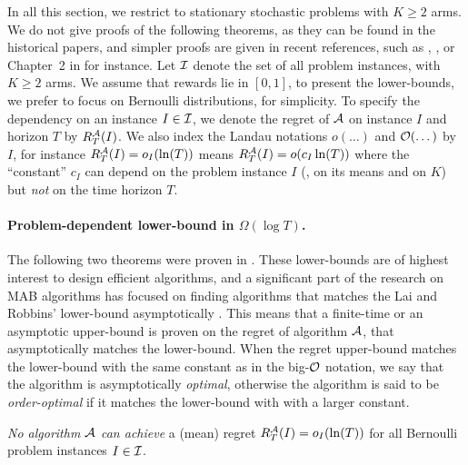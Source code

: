 In all this section, we restrict to stationary stochastic problems with $K\geq2$ arms.
We do not give proofs of the following theorems, as they can be found in the historical papers, and simpler proofs are given in recent references, such as \cite{Bubeck12}, \cite{LattimoreBanditAlgorithmsBook}, or Chapter~2 in \cite{Slivkins2019} for instance.
%
Let $\mathcal{I}$ denote the set of all problem instances, with $K \geq 2$ arms.
We assume that rewards lie in $[0,1]$,
to present the lower-bounds, we prefer to focus on Bernoulli distributions, for simplicity.
%
To specify the dependency on an instance $I\in\mathcal{I}$, we denote the regret of $\mathcal{A}$ on instance $I$ and horizon $T$ by $R_T^{\mathcal{A}}(I)$.
We also index the Landau notations $o(\dots)$ and $\mathop{}\mathopen{}\mathcal{O}\mathopen{}\left(\dots\right)$ by $I$,
for instance $R_T^{\mathcal{A}}(I) = o_I(\ln(T))$ means $R_T^{\mathcal{A}}(I) = \mathop{}\mathopen{}o\mathopen{}\left(c_I \ln(T)\right)$
where the ``constant'' $c_I$ can depend on the problem instance $I$ (\eg, on its means and on $K$) but \emph{not} on the time horizon $T$.


\paragraph{Problem-dependent lower-bound in $\Omega(\log T)$.}
\label{par:2:def_optimal_orderoptimal}
%
The following two theorems were proven in \cite{LaiRobbins85}.
These lower-bounds are of highest interest to design efficient algorithms,
and a significant part of the research on MAB algorithms has focused on finding algorithms that matches the Lai and Robbins' lower-bound asymptotically \cite{LaiRobbins85}.
%
This means that a finite-time or an asymptotic upper-bound is proven on the regret of algorithm $\mathcal{A}$, that asymptotically matches the lower-bound.
When the regret upper-bound matches the lower-bound with the same constant as in the big-$\mathcal{O}$ notation, we say that the algorithm is asymptotically \emph{optimal},
otherwise the algorithm is said to be \emph{order-optimal} if it matches the lower-bound with with a larger constant.


\begin{theorem}\label{thm:2:firstLogTLowerBound}
\begin{leftbar}[theorembar]  %
    \emph{No algorithm $\mathcal{A}$ can achieve} a (mean) regret $R_T^{\mathcal{A}}(I) = o_I(\ln(T))$ for all Bernoulli problem instances $I \in \mathcal{I}$.
    \hfill{} \cite[Theorem~2.12]{Slivkins2019}
\end{leftbar}  %
\end{theorem}

